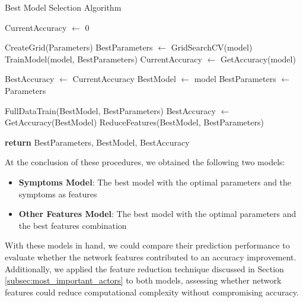 \begin{algorithm}[H] \small
	\caption{Best Model Selection Algorithm}\label{alg:best_selection}
	
	\begin{algorithmic}[1]
	
	\State CurrentAccuracy $\gets$ 0
	    
	    \State CreateGrid(Parameters)
	    \State BestParameters $\gets$ GridSearchCV(model)
	    \State TrainModel(model, BestParameters)
	    \State CurrentAccuracy $\gets$ GetAccuracy(model)

			\State BestAccuracy $\gets$ CurrentAccuracy
			\State BestModel $\gets$ model
			\State BestParameters $\gets$ Parameters
	    \EndIf

	\EndFor

	\State FullDataTrain(BestModel, BestParameters)
	\State BestAccuracy $\gets$ GetAccuracy(BestModel)
	\State ReduceFeatures(BestModel, BestParameters)
	
	\State \textbf{return} BestParameters, BestModel, BestAccuracy
	\end{algorithmic}
\end{algorithm}


At the conclusion of these procedures, we obtained the following two models:\\

\begin{itemize}
    \setlength\itemsep{0.4em} %
    \item \textbf{Symptoms Model}: The best model with the optimal parameters and the symptoms as features
    \item \textbf{Other Features Model}: The best model with the optimal parameters and the best features combination
\end{itemize}
\vspace{0.4cm}

With these models in hand, we could compare their prediction performance to evaluate whether the network 
features contributed to an accuracy improvement. Additionally, we applied the feature reduction technique discussed 
in Section \ref{subsec:most_important_actors} to both models, assessing whether network features could reduce computational 
complexity without compromising accuracy.

